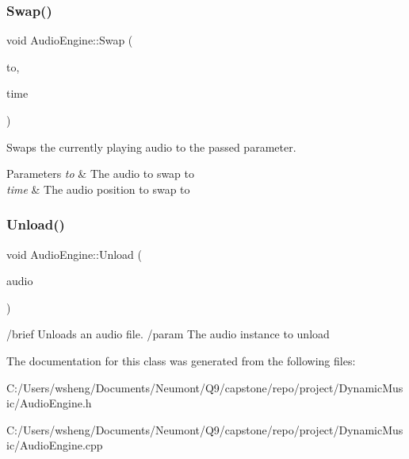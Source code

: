 \subsubsection{\texorpdfstring{Swap()}{Swap()}}
{\footnotesize\ttfamily void Audio\+Engine\+::\+Swap (\begin{DoxyParamCaption}\item[{\hyperlink{class_audio}{Audio} $\ast$}]{to,  }\item[{\hyperlink{class_audio_time}{Audio\+Time}}]{time }\end{DoxyParamCaption})\hspace{0.3cm}{\ttfamily [static]}}



Swaps the currently playing audio to the passed parameter. 


\begin{DoxyParams}{Parameters}
{\em to} & The audio to swap to \\
\hline
{\em time} & The audio position to swap to \\
\hline
\end{DoxyParams}
\mbox{\label{class_audio_engine_a4731748285d63c441eedab6b0e47440e}} 
\subsubsection{\texorpdfstring{Unload()}{Unload()}}
{\footnotesize\ttfamily void Audio\+Engine\+::\+Unload (\begin{DoxyParamCaption}\item[{\hyperlink{class_audio}{Audio} $\ast$}]{audio }\end{DoxyParamCaption})\hspace{0.3cm}{\ttfamily [static]}}

/brief Unloads an audio file. /param The audio instance to unload 

The documentation for this class was generated from the following files\+:\begin{DoxyCompactItemize}
\item 
C\+:/\+Users/wsheng/\+Documents/\+Neumont/\+Q9/capstone/repo/project/\+Dynamic\+Music/Audio\+Engine.\+h\item 
C\+:/\+Users/wsheng/\+Documents/\+Neumont/\+Q9/capstone/repo/project/\+Dynamic\+Music/Audio\+Engine.\+cpp\end{DoxyCompactItemize}
